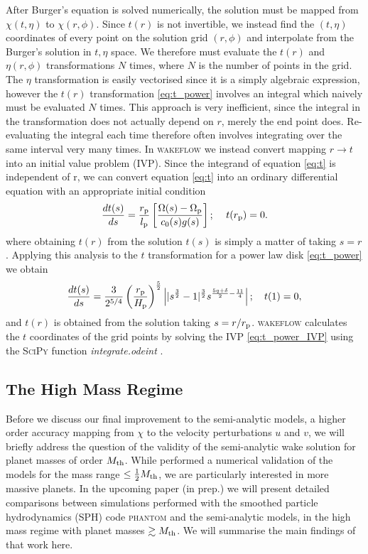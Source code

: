 After Burger's equation is solved numerically, the solution must be mapped from $\chi(t,\eta)$ to $\chi(r,\phi)$.
Since $t(r)$ is not invertible, we instead find the $(t,\eta)$ coordinates of every point on the solution grid $(r,\phi)$ and interpolate from the Burger's solution in $t,\eta$ space.
We therefore must evaluate the $t(r)$ and $\eta(r,\phi)$ transformations $N$ times, where $N$ is the number of points in the grid.
The $\eta$ transformation is easily vectorised since it is a simply algebraic expression, however the $t(r)$ transformation \ref{eq:t_power} involves an integral which naively must be evaluated $N$ times.
This approach is very inefficient, since the integral in the transformation does not actually depend on $r$, merely the end point does.
Re-evaluating the integral each time therefore often involves integrating over the same interval very many times.
In \textsc{wakeflow} we instead convert mapping $r\rightarrow t$ into an initial value problem (IVP).
Since the integrand of equation \ref{eq:t} is independent of r, we can convert equation \ref{eq:t} into an ordinary differential equation with an appropriate initial condition
\begin{align}
    \frac{dt(s)}{ds} = \frac{r_{\rm p}}{l_{\rm p}} \left[ \frac{\Omega(s) - \Omega_{\rm p}}{c_0(s) g(s)} \right]; \quad \, t(r_{\rm p}) = 0.
\end{align}
where obtaining $t(r)$ from the solution $t(s)$ is simply a matter of taking $s=r$.
Applying this analysis to the $t$ transformation for a power law disk \ref{eq:t_power} we obtain 
\begin{align}
    \frac{dt(s)}{ds} = \frac{3}{2^{5/4}} \left( \frac{r_{\rm p}}{H_{\rm p}} \right)^{\frac{5}{2}} \left| |s^\frac{3}{2} - 1|^\frac{3}{2} s^{\frac{5q+\delta}{2}-\frac{11}{4}} \right|; \quad t(1)=0, \label{eq:t_power_IVP}
\end{align}
and $t(r)$ is obtained from the solution taking $s=r/r_{\rm p}$.
\textsc{wakeflow} calculates the $t$ coordinates of the grid points by solving the IVP \ref{eq:t_power_IVP} using the \textsc{SciPy} function \textit{integrate.odeint} \citep{virtanen2020}.

\subsection{The High Mass Regime} \label{sec:high_mass}

Before we discuss our final improvement to the semi-analytic models, a higher order accuracy mapping from $\chi$ to the velocity perturbations $u$ and $v$, we will briefly address the question of the validity of the semi-analytic wake solution for planet masses of order $M_{\rm th}$.
While \citet{cimerman2021} performed a numerical validation of the models for the mass range $\le \frac{1}{2} M_{\rm th}$, we are particularly interested in more massive planets.
In the upcoming paper \citeauthor{fasanoinprep.} (in prep.) we will present detailed comparisons between simulations performed with the smoothed particle hydrodynamics (SPH) code \textsc{phantom} \citep{price2018} and the semi-analytic models, in the high mass regime with planet masses $\gtrsim M_{\rm th}$.
We will summarise the main findings of that work here.

